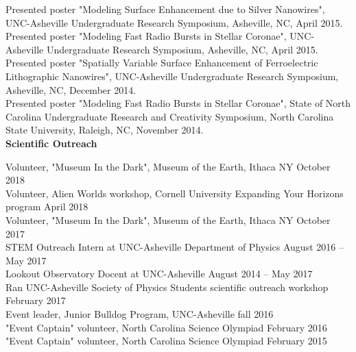\documentclass[letterpaper, 11pt]{article}
\newcommand{\noi}{\noindent}
\begin{document}
\noi Presented poster "Modeling Surface Enhancement due to Silver Nanowires", UNC-Asheville Undergraduate Research Symposium, Asheville, NC, April 2015.
\\

\noi Presented poster "Modeling Fast Radio Bursts in Stellar Coronae", UNC-Asheville Undergraduate Research Symposium, Asheville, NC, April 2015.
\\

\noi Presented poster "Spatially Variable Surface Enhancement of
Ferroelectric Lithographic Nanowires", UNC-Asheville Undergraduate Research Symposium, Asheville, NC, December 2014.
\\

\noi Presented poster "Modeling Fast Radio Bursts in Stellar Coronae", State of North Carolina Undergraduate Research and Creativity Symposium, North Carolina State University, Raleigh, NC, November 2014.
\\

\noi \textbf{Scientific Outreach}

\noi Volunteer, "Museum In the Dark", Museum of the Earth, Ithaca NY \hfill October 2018
\\

\noi Volunteer, Alien Worlds workshop, Cornell University Expanding Your Horizons program \hfill April 2018
\\

\noi Volunteer, "Museum In the Dark", Museum of the Earth, Ithaca NY \hfill October 2017
\\

\noi STEM Outreach Intern at UNC-Asheville Department of Physics \hfill August 2016 -- May 2017
\\

\noi Lookout Observatory Docent at UNC-Asheville \hfill August 2014 -- May 2017
\\

\noi Ran UNC-Asheville Society of Physics Students scientific outreach workshop \hfill February 2017
\\

\noi Event leader, Junior Bulldog Program, UNC-Asheville \hfill fall 2016 
\\

\noi "Event Captain" volunteer, North Carolina Science Olympiad \hfill February 2016
\\

\noi "Event Captain" volunteer, North Carolina Science Olympiad \hfill February 2015
\\
\end{document}
